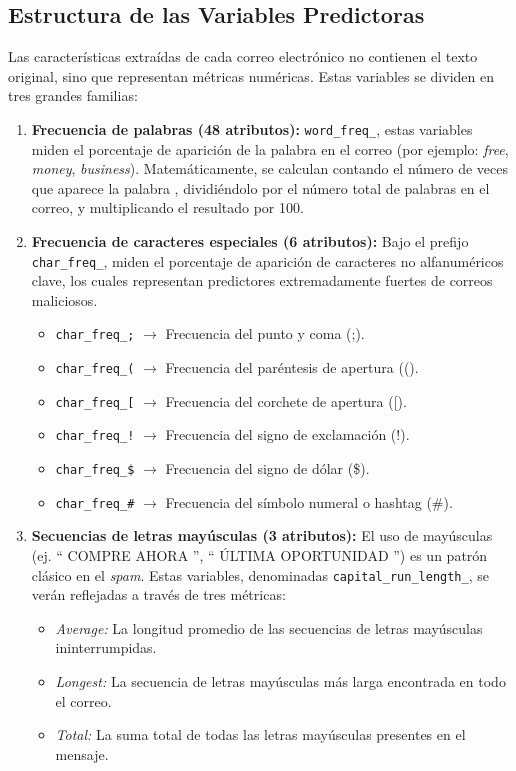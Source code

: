 \documentclass[a4paper,11pt]{book}
\begin{document}
\subsection{Estructura de las Variables Predictoras}
Las características extraídas de cada correo electrónico no contienen el texto original, sino que representan métricas numéricas. Estas variables se dividen en tres grandes familias:
\begin{enumerate}
    \item \textbf{Frecuencia de palabras (48 atributos):} \texttt{word\_freq\_}, estas variables miden el porcentaje de aparición de la palabra en el correo (por ejemplo: \textit{free}, \textit{money}, \textit{business}). Matemáticamente, se calculan contando el número de veces que aparece la palabra , dividiéndolo por el número total de palabras en el correo, y multiplicando el resultado por 100.
    
    \item \textbf{Frecuencia de caracteres especiales (6 atributos):} Bajo el prefijo \texttt{char\_freq\_}, miden el porcentaje de aparición de caracteres no alfanuméricos clave, los cuales representan predictores extremadamente fuertes de correos maliciosos.

\begin{itemize}
    \item \texttt{char\_freq\_;} $\rightarrow$ Frecuencia del punto y coma (;).
    \item \texttt{char\_freq\_(} $\rightarrow$ Frecuencia del paréntesis de apertura (().
    \item \texttt{char\_freq\_[} $\rightarrow$ Frecuencia del corchete de apertura ([).
    \item \texttt{char\_freq\_!} $\rightarrow$ Frecuencia del signo de exclamación (!).
    \item \texttt{char\_freq\_\$} $\rightarrow$ Frecuencia del signo de dólar (\$).
    \item \texttt{char\_freq\_\#} $\rightarrow$ Frecuencia del símbolo numeral o hashtag (\#).
\end{itemize}
    
    \item \textbf{Secuencias de letras mayúsculas (3 atributos):} El uso de mayúsculas (ej.  ``  COMPRE AHORA '',  `` ÚLTIMA OPORTUNIDAD '') es un patrón  clásico en el \textit{spam}. Estas variables, denominadas \texttt{capital\_run\_length\_}, se verán reflejadas  a través de tres métricas:
    \begin{itemize}
        \item \textit{Average:} La longitud promedio de las secuencias de letras mayúsculas ininterrumpidas.
        \item \textit{Longest:} La secuencia de letras mayúsculas más larga encontrada en todo el correo.
        \item \textit{Total:} La suma total de todas las letras mayúsculas presentes en el mensaje.
    \end{itemize}
\end{enumerate}
\end{document}
